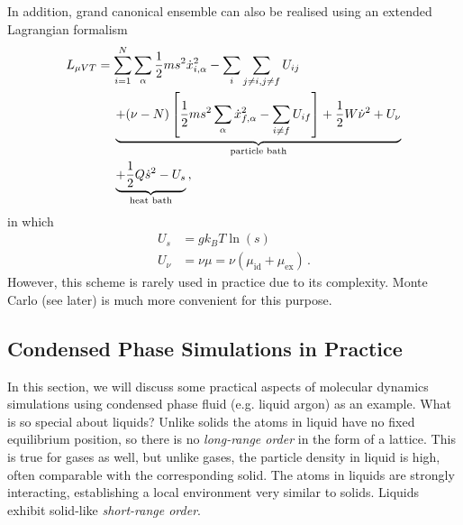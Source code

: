 \documentclass{article}
\theoremstyle{plain}\theoremheaderfont{\normalfont\itshape}\theorembodyfont{\rmfamily}\theoremseparator{.}\newtheorem*{rem}{Remark}\newtheorem*{ex}{Example}\newtheorem*{proof}{Proof}\newtheorem*{altp}{Alternative proof}
\theoremstyle{plain}\theoremheaderfont{\normalfont\bfseries}\theorembodyfont{\rmfamily}\theoremseparator{.}\newtheorem{thm}{Theorem}[section]\newtheorem{lem}[thm]{Lemma}\newtheorem{prop}[thm]{Proposition}\newtheorem*{cor}{Corollary}\newtheorem{defn}[thm]{Definition}\newtheorem{clm}[thm]{Claim}\newtheorem{clminproof}{Claim}\newtheorem{alg}[thm]{Algorithm}\newtheorem{hyp}[thm]{Hypothesis}\newtheorem{law}[thm]{Law}
\theoremstyle{break}\theoremheaderfont{\normalfont\itshape}\theorembodyfont{\rmfamily}\theoremseparator{.\medskip}\newtheorem*{proofskip}{Proof}\newtheorem*{exs}{Examples}\newtheorem*{rems}{Remarks}
\theoremstyle{break}\theoremheaderfont{\normalfont\bfseries}\theorembodyfont{\rmfamily}\theoremseparator{.\medskip}\newtheorem{lemskip}[thm]{Lemma}\newtheorem{defnskip}[thm]{Definition}\newtheorem{propskip}[thm]{Proposition}\newtheorem{thmskip}[thm]{Theorem}
\numberwithin{equation}{section}
\begin{document}
    In addition, grand canonical ensemble can also be realised using an extended Lagrangian formalism
    \begin{align}
        L_{\mu VT}&=\sum_{i=1}^{N}\sum_\alpha\frac{1}{2}ms^2\dot{x}_{i,\alpha}^2-\sum_i\sum_{j\ne i,j\ne f}U_{ij}\notag\\
        &\quad\ \underbrace{+(\nu-N)\left[\frac{1}{2}ms^2\sum_\alpha \dot{x}_{f,\alpha}^2-\sum_{i\ne f}U_{if}\right]+\frac{1}{2}W\dot{\nu}^2+U_\nu}_{\text{particle bath}}\notag\\
        &\quad\ \underbrace{+\frac{1}{2}Q\dot{s}^2-U_s}_{\text{heat bath}}\,,
    \end{align}
    in which
    \begin{align}
        U_s&=gk_B T\ln(s)\\
        U_\nu&=\nu\mu=\nu(\mu_{\text{id}}+\mu_{\text{ex}})\,.
    \end{align}
    However, this scheme is rarely used in practice due to its complexity. Monte Carlo (see later) is much more convenient for this purpose.

    \subsection{Condensed Phase Simulations in Practice}
    In this section, we will discuss some practical aspects of molecular dynamics simulations using condensed phase fluid (e.g. liquid argon) as an example. What is so special about liquids? Unlike solids the atoms in liquid have no fixed equilibrium position, so there is no \textit{long-range order} in the form of a lattice. This is true for gases as well, but unlike gases, the particle density in liquid is high, often comparable with the corresponding solid. The atoms in liquids are strongly interacting, establishing a local environment very similar to solids. Liquids exhibit solid-like \textit{short-range order}.
\end{document}
